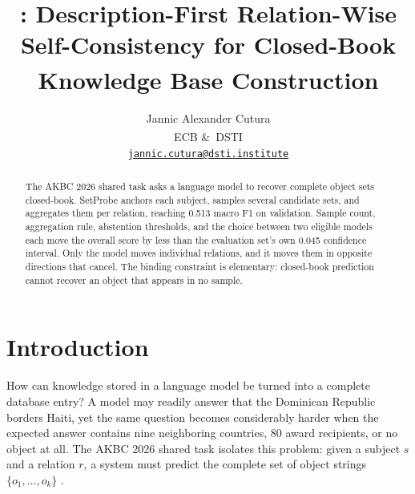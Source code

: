 \documentclass[11pt]{article}
\title{\systemname: Description-First Relation-Wise Self-Consistency for
Closed-Book Knowledge Base Construction\textsuperscript{\ding{73}}}
\author{Jannic Alexander Cutura \\
  \textsc{ECB}\textsuperscript{\dag} \&\, \textsc{DSTI}\textsuperscript{\ddag} \\
  \normalfont\normalsize\href{mailto:jannic.cutura@dsti.institute}%
    {\texttt{jannic.cutura@dsti.institute}}}
\newcommand{\systemname}{SetProbe}
\begin{document}
\maketitle

{\let\thefootnote\relax{}}
\renewcommand{\thefootnote}{\fnsymbol{footnote}}
\renewcommand{\thefootnote}{\arabic{footnote}}

\begin{abstract}
The AKBC 2026 shared task asks a language model to recover complete object sets
closed-book. \systemname{} anchors each subject, samples several candidate
sets, and aggregates them per relation, reaching 0.513 macro F1 on validation.
Sample count, aggregation rule, abstention thresholds, and the choice between
two eligible models each move the overall score by less than the evaluation
set's own 0.045 confidence interval. Only the model moves individual
relations, and it moves them in opposite directions that cancel. The binding
constraint is elementary: closed-book prediction cannot recover an object that
appears in no sample.
\end{abstract}

\section{Introduction}
\label{sec:introduction}

How can knowledge stored in a language model be turned into a complete database
entry? A model may readily answer that the Dominican Republic borders Haiti,
yet the same question becomes considerably harder when the expected answer
contains nine neighboring countries, 80 award recipients, or no object at all.
The AKBC 2026 shared task isolates this problem: given a subject \(s\) and a
relation \(r\), a system must predict the complete set of object strings
\(\{o_1,\ldots,o_k\}\) \citep{kalo-etal-2026-akbc-shared-task}.
\end{document}
